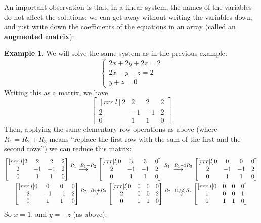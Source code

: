 \documentclass[a4paper,leqno]{article}
\newcommand{\grstep}[2][\relax]{%
   \ensuremath{\mathrel{
       {\mathop{\longrightarrow}\limits^{#2\mathstrut}_{
                                     \begin{subarray}{l} #1 \end{subarray}}}}}}
\numberwithin{equation}{section}
\theoremstyle{definition}
\newtheorem{ex}[equation]{Example}
\theoremstyle{remark}
\newcommand{\df}[1]{\textbf{#1}}
\begin{document}
An important observation is that, in a linear system, the names of the variables do not affect the solutions: we can get away without
writing the variables down, and just write down the coefficients of the equations in an array (called an \df{augmented matrix}):
\begin{ex}
  We will solve the same system as in the previous example:
  \begin{equation}
    \begin{cases}
      2x + 2y + 2z = 2\\
      2x - y - z = 2\\
      y + z = 0
    \end{cases}
  \end{equation}
  Writing this as a matrix, we have
  \begin{equation}
    \begin{bmatrix}[rrr|l]
      2 & 2 & 2 & 2\\
      2 & -1 & -1 & 2\\
      0 & 1 & 1 & 0
    \end{bmatrix}
  \end{equation}
  Then, applying the same elementary row operations as above (where $ R_1 = R_2 + R_3 $ means ``replace the first row with the sum
  of the first and the second rows'') we can reduce this matrix:
  \begin{gather*}
    \begin{bmatrix}[rrr|l]
      2 & 2 & 2 & 2\\
      2 & -1 & -1 & 2\\
      0 & 1 & 1 & 0
    \end{bmatrix}
    \grstep{R_1 = R_1 - R_2}
    \begin{bmatrix}[rrr|l]
      0 & 3 & 3 & 0\\
      2 & -1 & -1 & 2\\
      0 & 1 & 1 & 0
    \end{bmatrix}
    \grstep{R_1 = R_1 - 3R_3}
    \begin{bmatrix}[rrr|l]
      0 & 0 & 0 & 0\\
      2 & -1 & -1 & 2\\
      0 & 1 & 1 & 0
    \end{bmatrix}\\
    \begin{bmatrix}[rrr|l]
      0 & 0 & 0 & 0\\
      2 & -1 & -1 & 2\\
      0 & 1 & 1 & 0
    \end{bmatrix}
    \grstep{R_2 = R_2 + R_3}
    \begin{bmatrix}[rrr|l]
      0 & 0 & 0 & 0\\
      2 & 0 & 0 & 2\\
      0 & 1 & 1 & 0
    \end{bmatrix}
    \grstep{R_2 = (1/2)R_2}
    \begin{bmatrix}[rrr|l]
      0 & 0 & 0 & 0\\
      1 & 0 & 0 & 1\\
      0 & 1 & 1 & 0
    \end{bmatrix}
  \end{gather*}
  So $ x = 1 $, and $ y = -z $ (as above).
\end{ex}
\end{document}
